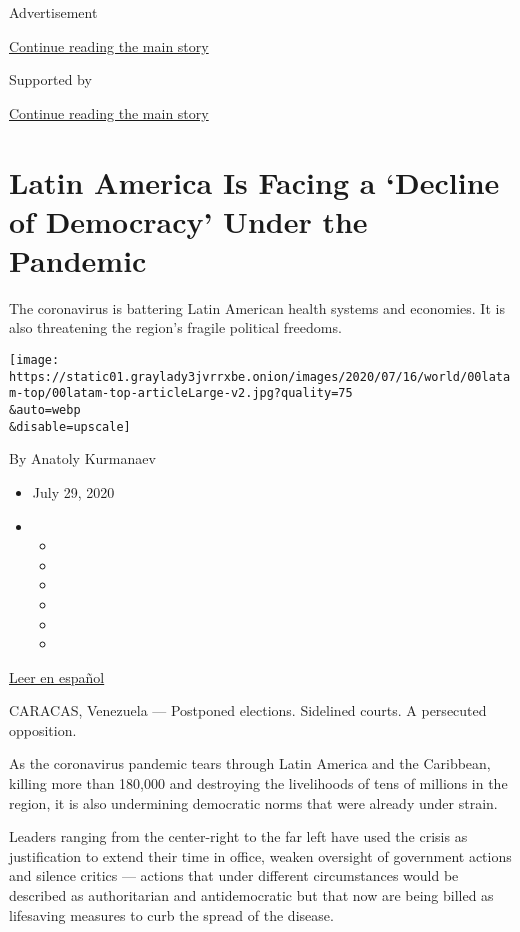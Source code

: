 Advertisement

\protect\hyperlink{after-top}{Continue reading the main story}

Supported by

\protect\hyperlink{after-sponsor}{Continue reading the main story}

\hypertarget{latin-america-is-facing-a-decline-of-democracy-under-the-pandemic}{%
\section{Latin America Is Facing a `Decline of Democracy' Under the
Pandemic}\label{latin-america-is-facing-a-decline-of-democracy-under-the-pandemic}}

The coronavirus is battering Latin American health systems and
economies. It is also threatening the region's fragile political
freedoms.

\texttt{[image: https://static01.graylady3jvrrxbe.onion/images/2020/07/16/world/00latam-top/00latam-top-articleLarge-v2.jpg?quality=75\\\&auto=webp\\\&disable=upscale]}

By Anatoly Kurmanaev

\begin{itemize}
\item
  July 29, 2020
\item
  \begin{itemize}
  \item
  \item
  \item
  \item
  \item
  \item
  \end{itemize}
\end{itemize}

\href{https://www.nytimes3xbfgragh.onion/es/2020/07/29/espanol/america-latina/democracia-america-latina-pandemia.html}{Leer
en español}

CARACAS, Venezuela --- Postponed elections. Sidelined courts. A
persecuted opposition.

As the coronavirus pandemic tears through Latin America and the
Caribbean, killing more than 180,000 and destroying the livelihoods of
tens of millions in the region, it is also undermining democratic norms
that were already under strain.

Leaders ranging from the center-right to the far left have used the
crisis as justification to extend their time in office, weaken oversight
of government actions and silence critics --- actions that under
different circumstances would be described as authoritarian and
antidemocratic but that now are being billed as lifesaving measures to
curb the spread of the disease.

